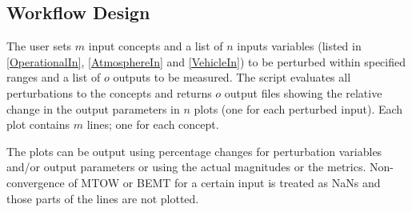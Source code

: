\subsection{Workflow Design}

The user sets $m$ input concepts and a list of $n$ inputs variables (listed in \autoref{OperationalIn}, \autoref{AtmosphereIn} and \autoref{VehicleIn}) to be perturbed within specified ranges and a list of $o$ outputs to be measured. The script evaluates all perturbations to the concepts and returns $o$ output files showing the relative change in the output parameters in $n$ plots (one for each perturbed input). Each plot contains $m$ lines; one for each concept.

The plots can be output using percentage changes for perturbation variables and/or output parameters or using the actual magnitudes or the metrics. Non-convergence of MTOW or BEMT for a certain input is treated as NaNs and those parts of the lines are not plotted.








 